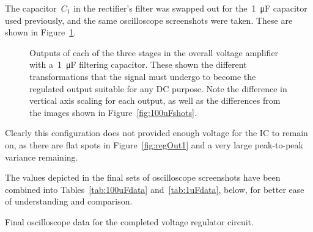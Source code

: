 The capacitor~$C_1$ in the rectifier's filter was swapped out for
the~\SI{1}{\micro\farad} capacitor used previously, and the same oscilloscope
screenshots were taken.  These are shown in Figure~\ref{fig:1uFshots}.
%
\begin{figure}[H]
	\centering
	\quad
	\quad

	\parbox{.9\textwidth}{
	\caption[Oscilloscope Screenshots --- Completed Circuit
	w/\SI{1}{\micro\farad} Capacitor]{Outputs of each of the three stages in
	the overall voltage amplifier with a~\SI{1}{\micro\farad} filtering
	capacitor.  These shown the different transformations that the signal must
	undergo to become the regulated output suitable for any DC purpose.  Note
	the difference in vertical axis scaling for each output, as well as the
	differences from the images shown in Figure~\ref{fig:100uFshots}.}
	\label{fig:1uFshots}
	}
\end{figure}
%
Clearly this configuration does not provided enough voltage for the IC to
remain on, as there are flat spots in Figure~\ref{fig:regOut1} and a very large
peak-to-peak variance remaining.

The values depicted in the final sets of oscilloscope screenshots  have been
combined into Tables~\ref{tab:100uFdata} and~\ref{tab:1uFdata}, below, for
better ease of understanding and comparison.
%
\begin{table}[H]
	\centering
	\quad

	\parbox{.8\textwidth}{
	\caption[Tables --- Final Oscilloscope Data]{Final oscilloscope data for
	the completed voltage regulator circuit.}
	\label{tab:100uFdata}}
\end{table}
